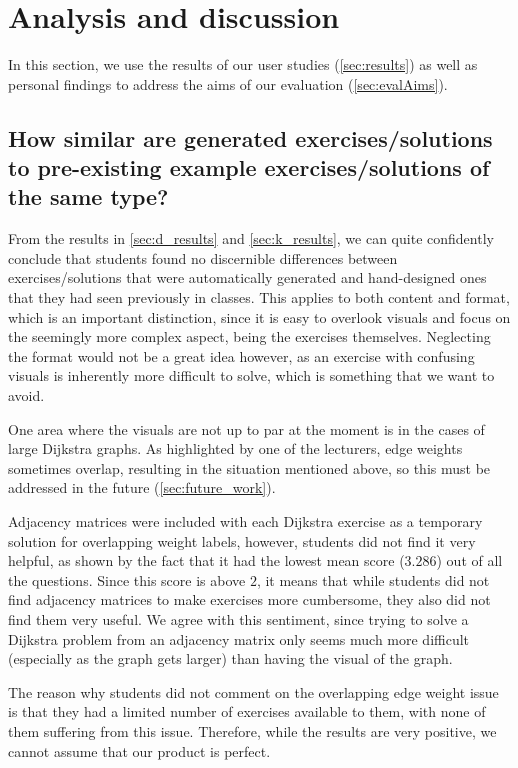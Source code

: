 \documentclass{l4proj}
\begin{document}
\section{Analysis and discussion}
\label{sec:analysis}

In this section, we use the results of our user studies (\autoref{sec:results}) as well as personal findings to address the aims of our evaluation (\autoref{sec:evalAims}).

\subsection*{How similar are generated exercises/solutions to pre-existing example exercises/solutions of the same type?}

From the results in \autoref{sec:d_results} and \autoref{sec:k_results}, we can quite confidently conclude that students found no discernible differences between exercises/solutions that were automatically generated and hand-designed ones that they had seen previously in classes. This applies to both content and format, which is an important distinction, since it is easy to overlook visuals and focus on the seemingly more complex aspect, being the exercises themselves. Neglecting the format would not be a great idea however, as an exercise with confusing visuals is inherently more difficult to solve, which is something that we want to avoid.

One area where the visuals are not up to par at the moment is in the cases of large Dijkstra graphs. As highlighted by one of the lecturers, edge weights sometimes overlap, resulting in the situation mentioned above, so this must be addressed in the future (\autoref{sec:future_work}). 

Adjacency matrices were included with each Dijkstra exercise as a temporary solution for overlapping weight labels, however, students did not find it very helpful, as shown by the fact that it had the lowest mean score ($3.286$) out of all the questions. Since this score is above $2$, it means that while students did not find adjacency matrices to make exercises more cumbersome, they also did not find them very useful. We agree with this sentiment, since trying to solve a Dijkstra problem from an adjacency matrix only seems much more difficult (especially as the graph gets larger) than having the visual of the graph.

The reason why students did not comment on the overlapping edge weight issue is that they had a limited number of exercises available to them, with none of them suffering from this issue. Therefore, while the results are very positive, we cannot assume that our product is perfect.
\end{document}

